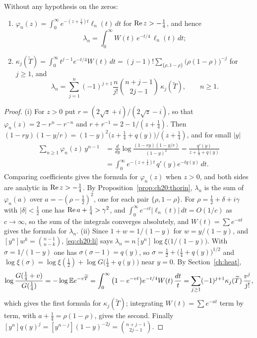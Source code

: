 \begin{proposition}\label{prop:ch20:heat}
Without any hypothesis on the zeros:
\begin{enumerate}
\item[(i)] $\varphi_n(z)=\int_0^\infty e^{-(z+\frac14)t}\ell_n(t)\,dt$ for $\operatorname{Re} z>-\frac14$, and hence
\[
\lambda_n=\int_0^\infty W(t)\,e^{-t/4}\,\ell_n(t)\,dt ;
\]
\item[(ii)] $\kappa_j(\widetilde T)=\int_0^\infty t^{j-1}e^{-t/4}W(t)\,dt=(j-1)!\sum_{\{\rho,1-\rho\}}\big(\rho(1-\rho)\big)^{-j}$ for $j\ge1$, and
\[
\lambda_n=\sum_{j=1}^n(-1)^{j+1}\frac n{j!}\binom{n+j-1}{2j-1}\,\kappa_j(\widetilde T),\qquad n\ge1 .
\]
\end{enumerate}
\end{proposition}

\begin{proof}
(i) For $z>0$ put $r=(2\sqrt z+i)/(2\sqrt z-i)$, so that $\varphi_n(z)=2-r^n-r^{-n}$ and $r+r^{-1}=2-1/(z+\frac14)$. Then $(1-ry)(1-y/r)=(1-y)^2\big(z+\frac14+q(y)\big)/(z+\frac14)$, and for small $|y|$
\[
\begin{aligned}\sum_{n\ge1}\varphi_n(z)\,y^{n-1}&=\frac d{dy}\log\frac{(1-ry)(1-y/r)}{(1-y)^2}=\frac{q'(y)}{z+\frac14+q(y)}\\&=\int_0^\infty e^{-(z+\frac14)t}\,q'(y)e^{-tq(y)}\,dt .\end{aligned}
\]
Comparing coefficients gives the formula for $\varphi_n(z)$ when $z>0$, and both sides are analytic in $\operatorname{Re} z>-\frac14$. By Proposition~\ref{prop:ch20:thorin}, $\lambda_n$ is the sum of $\varphi_n(a)$ over $a=-(\rho-\frac12)^2$, one for each pair $\{\rho,1-\rho\}$. For $\rho=\frac12+\delta+i\gamma$ with $|\delta|<\frac12$ one has $\operatorname{Re} a+\frac14>\gamma^2$, and $\int_0^\infty e^{-ct}|\ell_n(t)|\,dt=O(1/c)$ as $c\to\infty$, so the sum of the integrals converges absolutely, and $W(t)=\sum e^{-at}$ gives the formula for $\lambda_n$.
(ii) Since $1+w=1/(1-y)$ for $w=y/(1-y)$, and $[y^n]w^k=\binom{n-1}{n-k}$, \eqref{eq:ch20:li} says $\lambda_n=n[y^n]\log\xi\big(1/(1-y)\big)$. With $\sigma=1/(1-y)$ one has $\sigma(\sigma-1)=q(y)$, so $\sigma=\frac12+\big(\frac14+q(y)\big)^{1/2}$ and $\log\xi(\sigma)=\log\xi(\frac12)+\log G\big(\frac14+q(y)\big)$ near $y=0$. By Section~\ref{ch:heat},
\[
\log\frac{G(\frac14+v)}{G(\frac14)}=-\log\mathbb{E} e^{-v\widetilde T}=\int_0^\infty\big(1-e^{-vt}\big)e^{-t/4}W(t)\,\frac{dt}t=\sum_{j\ge1}(-1)^{j+1}\kappa_j(\widetilde T)\,\frac{v^j}{j!},
\]
which gives the first formula for $\kappa_j(\widetilde T)$; integrating $W(t)=\sum e^{-at}$ term by term, with $a+\frac14=\rho(1-\rho)$, gives the second. Finally $[y^n]q(y)^j=[y^{n-j}](1-y)^{-2j}=\binom{n+j-1}{2j-1}$.
\end{proof}

